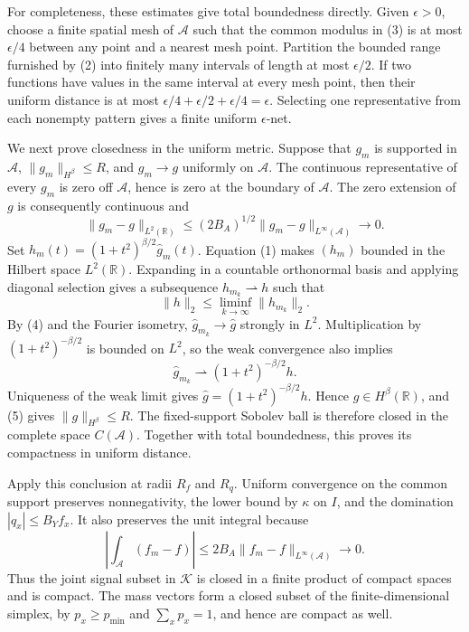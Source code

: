 For completeness, these estimates give total boundedness directly.  Given
\(\epsilon>0\), choose a finite spatial mesh of \(\mathcal A\) such that the
common modulus in (3) is at most \(\epsilon/4\) between any point and a
nearest mesh point.  Partition the bounded range furnished by (2) into
finitely many intervals of length at most \(\epsilon/2\).  If two functions
have values in the same interval at every mesh point, then their uniform
distance is at most
\(\epsilon/4+\epsilon/2+\epsilon/4=\epsilon\).  Selecting one representative
from each nonempty pattern gives a finite uniform \(\epsilon\)-net.

We next prove closedness in the uniform metric.  Suppose that
\(g_m\) is supported in \(\mathcal A\),
\(\|g_m\|_{H^\beta}\le R\), and \(g_m\to g\) uniformly on
\(\mathcal A\).  The continuous representative of every \(g_m\) is zero off
\(\mathcal A\), hence is zero at the boundary of \(\mathcal A\).  The zero
extension of \(g\) is consequently continuous and
\[
 \|g_m-g\|_{L^2(\mathbb R)}
 \le (2B_A)^{1/2}\|g_m-g\|_{L^\infty(\mathcal A)}
 \longrightarrow0.                                               \tag{4}
\]
Set \(h_m(t)=(1+t^2)^{\beta/2}\widehat g_m(t)\).  Equation (1) makes
\((h_m)\) bounded in the Hilbert space \(L^2(\mathbb R)\).  Expanding in a
countable orthonormal basis and applying diagonal selection gives a subsequence
\(h_{m_k}\rightharpoonup h\) such that
\[
 \|h\|_2\le\liminf_{k\to\infty}\|h_{m_k}\|_2.                    \tag{5}
\]
By (4) and the Fourier isometry,
\(\widehat g_{m_k}\to\widehat g\) strongly in \(L^2\).  Multiplication by
\((1+t^2)^{-\beta/2}\) is bounded on \(L^2\), so the weak convergence also
implies
\[
 \widehat g_{m_k}\rightharpoonup(1+t^2)^{-\beta/2}h.
\]
Uniqueness of the weak limit gives
\(\widehat g=(1+t^2)^{-\beta/2}h\).  Hence \(g\in H^\beta(\mathbb R)\),
and (5) gives \(\|g\|_{H^\beta}\le R\).  The fixed-support Sobolev ball is
therefore closed in the complete space \(C(\mathcal A)\).  Together with
total boundedness, this proves its compactness in uniform distance.

Apply this conclusion at radii \(R_f\) and \(R_q\).  Uniform convergence on
the common support preserves nonnegativity, the lower bound by \(\kappa\) on
\(I\), and the domination \(|q_x|\le B_Yf_x\).  It also preserves the unit
integral because
\[
 \left|\int_{\mathcal A}(f_m-f)\right|
 \le2B_A\|f_m-f\|_{L^\infty(\mathcal A)}\longrightarrow0.         \tag{6}
\]
Thus the joint signal subset in \(\mathscr K\) is closed in a finite product
of compact spaces and is compact.  The mass vectors form a closed subset of
the finite-dimensional simplex, by \(p_x\ge p_{\min}\) and
\(\sum_xp_x=1\), and hence are compact as well.

